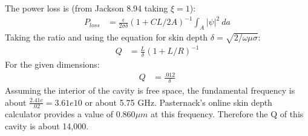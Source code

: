 \documentclass[a4paper,11pt]{article}
\numberwithin{equation}{section}
\newcommand{\lrp}[1]{\left({#1}\right)}
\begin{document}
The power loss is (from Jackson 8.94 taking $\xi = 1$):
\begin{align}
 P_{loss} &= \frac{\epsilon}{2\sigma\delta}\lrp{1+CL/2A}^{-1}\int_A |\psi|^2\ da
\end{align}
Taking the ratio and using the equation for skin depth $\delta = \sqrt{2/\omega\mu\sigma}$:
\begin{align}
 Q &= \frac{L}{\delta}\lrp{1+L/R}^{-1}
\end{align}
For the given dimensions:
\begin{align}
 Q &= \frac{.012}{\delta}
\end{align}
Assuming the interior of the cavity is free space, the fundamental frequency is about $\frac{2.41c}{.02} = 3.61e10$ or about 5.75 GHz.
Pasternack's online skin depth calculator provides a value of $0.860 \mu m$ at this frequency.
Therefore the Q of this cavity is about 14,000.
\end{document}
